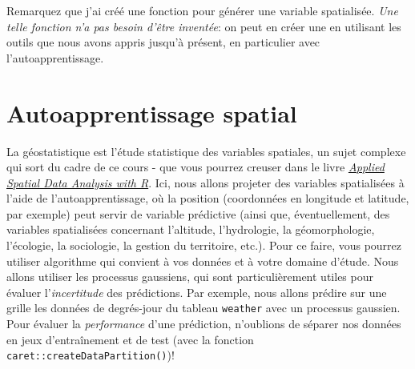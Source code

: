 \documentclass[]{book}
\newenvironment{Shaded}{\begin{snugshade}}{\end{snugshade}}
\newcommand{\DataTypeTok}[1]{\textcolor[rgb]{0.13,0.29,0.53}{#1}}
\newcommand{\FloatTok}[1]{\textcolor[rgb]{0.00,0.00,0.81}{#1}}
\newcommand{\KeywordTok}[1]{\textcolor[rgb]{0.13,0.29,0.53}{\textbf{#1}}}
\newcommand{\NormalTok}[1]{#1}
\newcommand{\OperatorTok}[1]{\textcolor[rgb]{0.81,0.36,0.00}{\textbf{#1}}}
\newcommand{\OtherTok}[1]{\textcolor[rgb]{0.56,0.35,0.01}{#1}}
\newcommand{\StringTok}[1]{\textcolor[rgb]{0.31,0.60,0.02}{#1}}
\begin{document}
Remarquez que j'ai créé une fonction pour générer une variable
spatialisée. \emph{Une telle fonction n'a pas besoin d'être inventée}:
on peut en créer une en utilisant les outils que nous avons appris
jusqu'à présent, en particulier avec l'autoapprentissage.

\hypertarget{autoapprentissage-spatial}{%
\section{Autoapprentissage spatial}\label{autoapprentissage-spatial}}

La géostatistique est l'étude statistique des variables spatiales, un
sujet complexe qui sort du cadre de ce cours - que vous pourrez creuser
dans le livre \href{https://asdar-book.org/}{\emph{Applied Spatial Data
Analysis with R}}. Ici, nous allons projeter des variables spatialisées
à l'aide de l'autoapprentissage, où la position (coordonnées en
longitude et latitude, par exemple) peut servir de variable prédictive
(ainsi que, éventuellement, des variables spatialisées concernant
l'altitude, l'hydrologie, la géomorphologie, l'écologie, la sociologie,
la gestion du territoire, etc.). Pour ce faire, vous pourrez utiliser
algorithme qui convient à vos données et à votre domaine d'étude. Nous
allons utiliser les processus gaussiens, qui sont particulièrement
utiles pour évaluer l'\emph{incertitude} des prédictions. Par exemple,
nous allons prédire sur une grille les données de degrés-jour du tableau
\texttt{weather} avec un processus gaussien. Pour évaluer la
\emph{performance} d'une prédiction, n'oublions de séparer nos données
en jeux d'entraînement et de test (avec la fonction
\texttt{caret::createDataPartition()})!

\begin{Shaded}
\end{Shaded}
\end{document}

